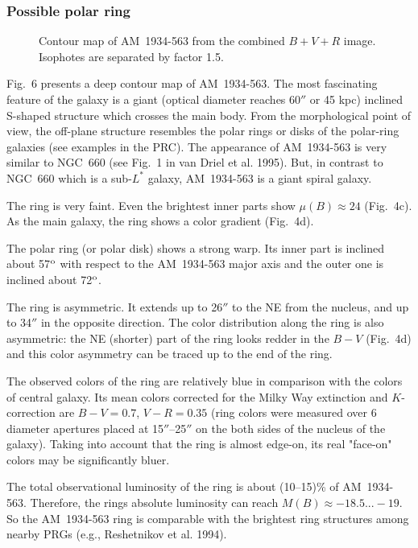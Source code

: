 \documentclass[]{aa}
\begin{document}
\subsubsection{Possible polar ring}

\begin{figure}
\centerline{}
\caption{Contour map of AM~1934-563 from the combined $B+V+R$ image.
Isophotes are separated by factor 1.5.}
\end{figure}

Fig.~6 presents a deep contour map of AM~1934-563. The most fascinating
feature of the galaxy is a giant (optical diameter reaches 60$''$
or 45 kpc) inclined S-shaped structure which crosses the main
body. From the morphological point of view, the off-plane structure
resembles the polar rings or disks of the polar-ring galaxies (see 
examples in the PRC).
The appearance of AM~1934-563 is very similar to NGC~660 (see Fig.~1 in 
van Driel et al. 1995). But, in contrast to NGC~660 which is a
sub-$L^*$ galaxy, AM~1934-563 is a giant spiral galaxy. 

The ring is very faint. Even the brightest inner parts show $\mu(B) \approx 24$
(Fig.~4c). As the main galaxy, the ring shows a color gradient
(Fig.~4d).

The polar ring (or polar disk) shows a strong warp. Its inner part is inclined
about 57$^{\rm o}$ with respect to the AM~1934-563 major axis and 
the outer one is inclined about 72$^{\rm o}$. 

The ring is asymmetric.
It extends up to 26$''$ to the NE from the nucleus, and up to 34$''$
in the opposite direction.
The color distribution along the ring is also asymmetric: the
NE (shorter) part of the ring looks redder in the $B-V$ (Fig.~4d) and
this color asymmetry can be traced up to the end of the ring. 

The observed colors of the ring are relatively blue in comparison with
the colors of central galaxy. Its mean colors corrected for
the Milky Way extinction and $K$-correction are $B-V=0.7$,
$V-R=0.35$ (ring colors were measured over 6 diameter
apertures placed at 15$''$--25$''$ on the both sides of the nucleus of the
galaxy). Taking into account that the ring is almost edge-on,
its real "face-on" colors may be significantly bluer. 

The total observational luminosity of the ring is
about (10--15)\% of AM~1934-563. Therefore, the rings absolute
luminosity can reach $M(B) \approx -18.5...-19$. So the AM~1934-563 
ring is comparable with the brightest ring structures among 
nearby PRGs (e.g., Reshetnikov et al. 1994). 
\end{document}
